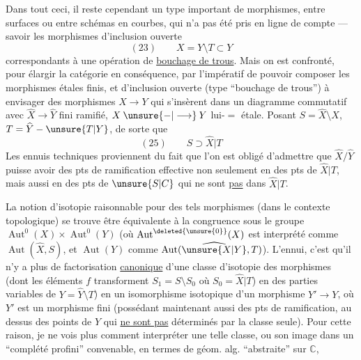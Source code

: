 Dans tout ceci, il reste cependant un
type important de  morphismes, entre
surfaces   ou entre schémas en
courbes, qui n'a pas été pris en ligne
de compte --- savoir les morphismes
d'inclusion ouverte
\[
(23)\qquad X=Y\setminus T\subset Y
\]
correspondants à une opération de \uline{bouchage
de trous}. Mais on est confronté, pour élargir la
catégorie en conséquence, par l'impératif de
pouvoir composer les morphismes étales finis,
et d'inclusion ouverte (type ``bouchage de trous'')
à envisager des morphismes $X\longrightarrow Y$ qui
s'insèrent dans un diagramme commutatif
avec $\widehat X\longrightarrow\widehat Y$ fini ramifié, $X\mathbin{\unsure{-|\longrightarrow}}Y$ lui-$=$ étale.
Posant $S=\widehat X\setminus X$, $T=\widehat Y-\unsure{T|Y}$, de sorte que
\[
(25)\qquad S\supset\widehat X|T
\]
Les ennuis techniques proviennent du fait que
l'on est obligé d'admettre que $\widehat X/\widehat Y$ puisse avoir des
pts de ramification effective non seulement en
des pts de $\widehat X|T$, mais aussi en des pts de $\unsure{S|C}$ qui
ne sont \uline{pas} dans $\widehat X|T$.

La notion d'isotopie raisonnable pour des
tels morphismes (dans le contexte topologique)
se trouve être équivalente à la congruence
sous le groupe $\operatorname{Aut}^0(X)\times\operatorname{Aut}^0(Y)$
(où $\operatorname{Aut}^{\deleted{\unsure{0}}}(X)$ est interprété comme $\operatorname{Aut}(\widehat X,S)$,
et $\operatorname{Aut}(Y)$ comme $\operatorname{Aut}(\widehat{\unsure{X|Y}},T)$). L'ennui,
c'est qu'il n'y a plus de factorisation
\uline{canonique} d'une classe d'isotopie des
morphismes  (dont les éléments  $f$
transforment $S_1=S\setminus S_0$ où $S_0=\widehat X|T$) en
des parties variables de $Y=\widehat Y\setminus T$) en
un isomorphisme  isotopique  
 d'un morphisme $Y'\longrightarrow Y$, où $Y'$ est un
morphisme fini (possédant maintenant aussi
 des pts de ramification, au dessus des
points de $Y$ qui \uline{ne sont pas} déterminés
par la classe seule). Pour cette raison,
je ne vois plus comment interpréter une
telle classe, ou son image dans un
 ``complété profini'' convenable,
en termes de géom. alg. ``abstraite'' sur $\mathbb C$,


